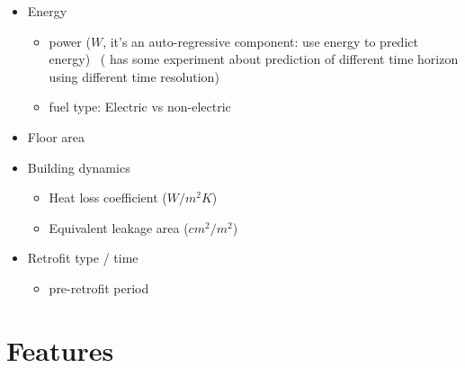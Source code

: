 \documentclass[12pt]{article}
\begin{document}
\begin{itemize}
\item Energy
  \begin{itemize}
  \item power ($W$, it's an auto-regressive component: use energy to
    predict energy)
    ~\cite{hammarsten1987critical}(\cite{mocanu2016deep} has some
    experiment about prediction of different time horizon using
    different time resolution)
  \item fuel type: Electric vs non-electric ~\cite{Yu20101637}
  \end{itemize}
\item Floor area~\cite{Yu20101637}
\item Building dynamics
  \begin{itemize}
  \item Heat loss coefficient ($W / m^2K$)~\cite{Yu20101637}
  \item Equivalent leakage area ($cm^2 / m^2$)~\cite{Yu20101637}
  \end{itemize}
\item Retrofit type / time
  \begin{itemize}
  \item pre-retrofit period~\cite{kissock2008methodology}
  \end{itemize}
\end{itemize}
\section{Features}
\end{document}
